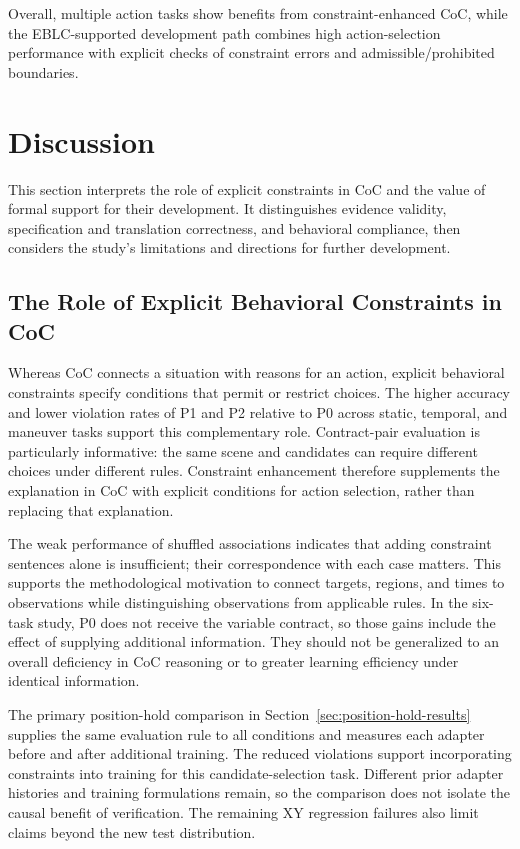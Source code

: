 \documentclass[nolineno]{ieeeaccess}
\begin{document}
Overall, multiple action tasks show benefits from constraint-enhanced CoC, while the EBLC-supported development path combines high action-selection performance with explicit checks of constraint errors and admissible/prohibited boundaries.\par
\section{Discussion}

This section interprets the role of explicit constraints in CoC and the value of formal support for their development. It distinguishes evidence validity, specification and translation correctness, and behavioral compliance, then considers the study's limitations and directions for further development.\par

\subsection{The Role of Explicit Behavioral Constraints in CoC}

Whereas CoC connects a situation with reasons for an action, explicit behavioral constraints specify conditions that permit or restrict choices. The higher accuracy and lower violation rates of P1 and P2 relative to P0 across static, temporal, and maneuver tasks support this complementary role. Contract-pair evaluation is particularly informative: the same scene and candidates can require different choices under different rules. Constraint enhancement therefore supplements the explanation in CoC with explicit conditions for action selection, rather than replacing that explanation.\par

The weak performance of shuffled associations indicates that adding constraint sentences alone is insufficient; their correspondence with each case matters. This supports the methodological motivation to connect targets, regions, and times to observations while distinguishing observations from applicable rules. In the six-task study, P0 does not receive the variable contract, so those gains include the effect of supplying additional information. They should not be generalized to an overall deficiency in CoC reasoning or to greater learning efficiency under identical information.\par

The primary position-hold comparison in Section~\ref{sec:position-hold-results} supplies the same evaluation rule to all conditions and measures each adapter before and after additional training. The reduced violations support incorporating constraints into training for this candidate-selection task. Different prior adapter histories and training formulations remain, so the comparison does not isolate the causal benefit of verification. The remaining XY regression failures also limit claims beyond the new test distribution.\par
\end{document}
